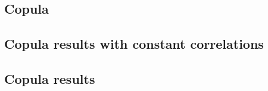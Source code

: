 \subsection{Copula}

\subsection{Copula results with constant correlations}
\subsection{Copula results}
%
%
%
%
%
%

